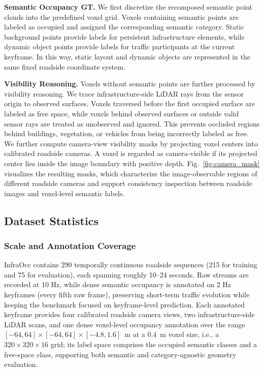 \noindent\textbf{Semantic Occupancy GT.}
We first discretize the recomposed semantic point clouds into the predefined
voxel grid. Voxels containing semantic points are labeled as occupied and
assigned the corresponding semantic category. Static background points provide
labels for persistent infrastructure elements, while dynamic object points
provide labels for traffic participants at the current keyframe. In this way,
static layout and dynamic objects are represented in the same fixed roadside
coordinate system.

\noindent\textbf{Visibility Reasoning.}
Voxels without semantic points are further processed by visibility reasoning.
We trace infrastructure-side LiDAR rays from the sensor origin to observed
surfaces. Voxels traversed before the first occupied surface are labeled as
free space, while voxels behind observed surfaces or outside valid sensor rays
are treated as unobserved and ignored. This prevents occluded regions behind
buildings, vegetation, or vehicles from being incorrectly labeled as free.
We further compute camera-view visibility masks by projecting voxel centers
into calibrated roadside cameras. A voxel is regarded as camera-visible if its
projected center lies inside the image boundary with positive depth.
Fig.~\ref{fig:camera_mask} visualizes the resulting masks, which characterize
the image-observable regions of different roadside cameras and support
consistency inspection between roadside images and voxel-level semantic labels.


\subsection{Dataset Statistics}
\label{sec:benchmark_statistics}

\subsubsection{Scale and Annotation Coverage}
InfraOcc contains 290 temporally continuous roadside sequences (215 for
training and 75 for evaluation), each spanning roughly 10--24 seconds. Raw
streams are recorded at 10 Hz, while dense semantic occupancy is annotated on
2 Hz keyframes (every fifth raw frame), preserving short-term traffic evolution
while keeping the benchmark focused on keyframe-level prediction. Each annotated
keyframe provides four calibrated roadside camera views, two infrastructure-side
LiDAR scans, and one dense voxel-level occupancy annotation over the range
$[-64,64]\!\times\![-64,64]\!\times\![-4.8,1.6]$~m at a $0.4$~m voxel size, i.e.,
a $320\times320\times16$ grid; its label space comprises the occupied semantic
classes and a free-space class, supporting both semantic and category-agnostic
geometry evaluation.


